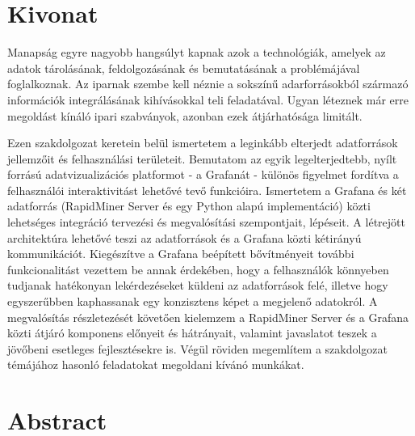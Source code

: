 \setcounter{page}{1}

\selecthungarian

\chapter*{Kivonat}

Manapság egyre nagyobb hangsúlyt kapnak azok a technológiák, amelyek az adatok tárolásának, feldolgozásának és bemutatásának a problémájával foglalkoznak. Az iparnak szembe kell néznie a sokszínű adarforrásokból származó információk integrálásának kihívásokkal teli feladatával. Ugyan léteznek már erre megoldást kínáló ipari szabványok, azonban ezek átjárhatósága limitált.

Ezen szakdolgozat keretein belül ismertetem a leginkább elterjedt adatforrások jellemzőit és felhasználási területeit. Bemutatom az egyik legelterjedtebb, nyílt forrású adatvizualizációs platformot - a Grafanát - különös figyelmet fordítva a felhasználói interaktivitást lehetővé tevő funkcióira. Ismertetem a Grafana és két adatforrás (RapidMiner Server és egy Python alapú implementáció) közti lehetséges integráció tervezési és megvalósítási szempontjait, lépéseit. A létrejött architektúra lehetővé teszi az adatforrások és a Grafana közti kétirányú kommunikációt. Kiegészítve a Grafana beépített bővítményeit további funkcionalitást vezettem be annak érdekében, hogy a felhasználók könnyeben tudjanak hatékonyan lekérdezéseket küldeni az adatforrások felé, illetve hogy egyszerűbben kaphassanak egy konzisztens képet a megjelenő adatokról. A megvalósítás részletezését követően kielemzem a RapidMiner Server és a Grafana közti átjáró komponens előnyeit és hátrányait, valamint javaslatot teszek a jövőbeni esetleges fejlesztésekre is. Végül röviden megemlítem a szakdolgozat témájához hasonló feladatokat megoldani kívánó munkákat.




\vfill
\selectenglish


\chapter*{Abstract}

